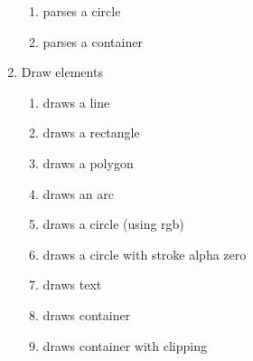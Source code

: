 \begin{enumerate}[label={T\arabic*}]
\begin{enumerate}[label={T\arabic{enumi}.\arabic*}]
		\item \label{test:js:parse:circle} parses a circle
		\item \label{test:js:parse:container} parses a container
	\end{enumerate}
	\item Draw elements
	\begin{enumerate}[label={T\arabic{enumi}.\arabic*}]
		\item \label{test:js:draw:line} draws a line
		\item \label{test:js:draw:rect} draws a rectangle
		\item \label{test:js:draw:polygon} draws a polygon
		\item \label{test:js:draw:arc} draws an arc
		\item \label{test:js:draw:circle} draws a circle (using rgb)
		\item \label{test:js:draw:circle:alpha} draws a circle with stroke alpha zero
		\item \label{test:js:draw:text} draws text
		\item \label{test:js:draw:container} draws container
		\item \label{test:js:draw:container:clipping} draws container with clipping
	\end{enumerate}


\end{enumerate}
